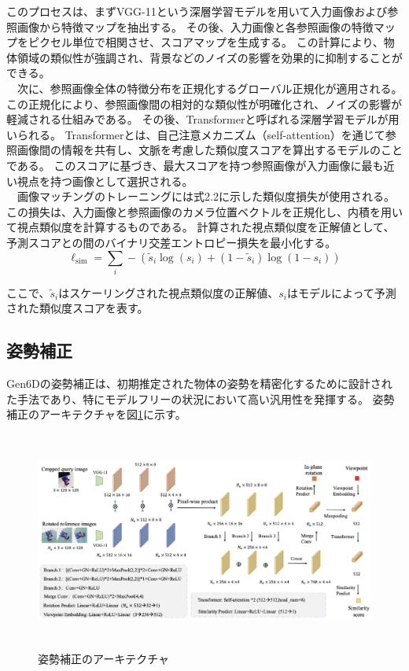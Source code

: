 このプロセスは、まずVGG-11という深層学習モデルを用いて入力画像および参照画像から特徴マップを抽出する。
その後、入力画像と各参照画像の特徴マップをピクセル単位で相関させ、スコアマップを生成する。
この計算により、物体領域の類似性が強調され、背景などのノイズの影響を効果的に抑制することができる。\\
　次に、参照画像全体の特徴分布を正規化するグローバル正規化が適用される。
この正規化により、参照画像間の相対的な類似性が明確化され、ノイズの影響が軽減される仕組みである。
その後、Transformerと呼ばれる深層学習モデルが用いられる。
Transformerとは、自己注意メカニズム（self-attention）を通じて参照画像間の情報を共有し、文脈を考慮した類似度スコアを算出するモデルのことである。
このスコアに基づき、最大スコアを持つ参照画像が入力画像に最も近い視点を持つ画像として選択される。\\
　画像マッチングのトレーニングには式2.2に示した類似度損失が使用される。
この損失は、入力画像と参照画像のカメラ位置ベクトルを正規化し、内積を用いて視点類似度を計算するものである。
計算された視点類似度を正解値として、予測スコアとの間のバイナリ交差エントロピー損失を最小化する。
\begin{equation}
	\ell_{\text{sim}} = \sum_{i} - \left( \tilde{s}_i \log(s_i) + (1 - \tilde{s}_i) \log(1 - s_i) \right)
	\tag{2.2}
\end{equation}
	
ここで、\(\tilde{s}_i\)はスケーリングされた視点類似度の正解値、\(s_i\)はモデルによって予測された類似度スコアを表す。

\subsection{姿勢補正}
Gen6Dの姿勢補正は、初期推定された物体の姿勢を精密化するために設計された手法であり、特にモデルフリーの状況において高い汎用性を発揮する。
姿勢補正のアーキテクチャを図\ref{fig:f5}に示す。
\begin{figure}[htbt]
	\centering
	 \includegraphics[height=72mm]{Figure/selector_arc.eps}
	 \caption{姿勢補正のアーキテクチャ}
	 \label{fig:f5}
\end{figure}

